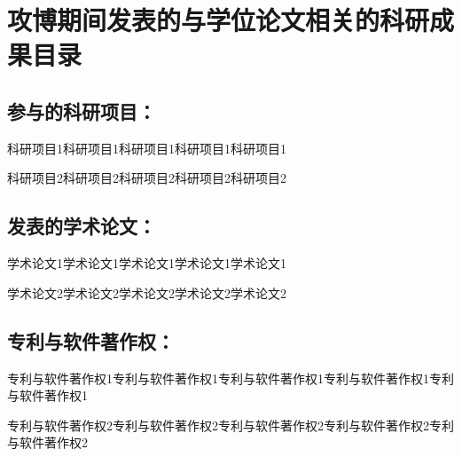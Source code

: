 \newenvironment{achievements}{\enumerate[label={[\arabic*]}, leftmargin=*]}{\endenumerate}

\chapter*{攻博期间发表的与学位论文相关的科研成果目录}

\section*{参与的科研项目：}

\begin{achievements}
\item 科研项目1科研项目1科研项目1科研项目1科研项目1
\item 科研项目2科研项目2科研项目2科研项目2科研项目2
\end{achievements}

\section*{发表的学术论文：}

\begin{achievements}
\item 学术论文1学术论文1学术论文1学术论文1学术论文1
\item 学术论文2学术论文2学术论文2学术论文2学术论文2
\end{achievements}

\section*{专利与软件著作权：}

\begin{achievements}
\item 专利与软件著作权1专利与软件著作权1专利与软件著作权1专利与软件著作权1专利与软件著作权1
\item 专利与软件著作权2专利与软件著作权2专利与软件著作权2专利与软件著作权2专利与软件著作权2
\end{achievements}
